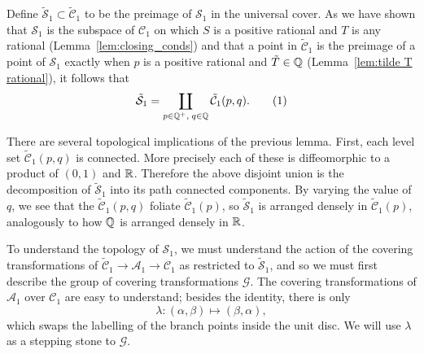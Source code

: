 Define $\mathcal{\tilde{S}}_1 \subset \mathcal{\tilde{C}}_1$ to be the preimage of $\mathcal{S}_1$ in the universal cover. As we have shown that $\mathcal{S}_1$ is the subspace of $\mathcal{C}_1$ on which $S$ is a positive rational and $T$ is any rational (Lemma~\ref{lem:closing_conds}) and that a point in $\mathcal{\tilde{C}}_1$ is the preimage of a point of $\mathcal{S}_1$ exactly when $p$ is a positive rational and $\tilde{T} \in \Q$ (Lemma~\ref{lem:tilde T rational}), it follows that
\[
\mathcal{\tilde{S}}_1 = \coprod_{p\in \Q^+,\; q\in \Q} \mathcal{\tilde{C}}_1(p,q).
\labelthis{eqn:def tilde S}
\]

There are several topological implications of the previous lemma. First, each level set $\mathcal{\tilde{C}}_1(p,q)$ is connected. More precisely each of these is diffeomorphic to a product of $(0,1)$ and $\R$. Therefore the above disjoint union is the decomposition of $\mathcal{\tilde{S}}_1$ into its path connected components. By varying the value of $q$, we see that the $\mathcal{\tilde{C}}_1(p,q)$ foliate $\mathcal{\tilde{C}}_1(p)$, so $\mathcal{\tilde{S}}_1$ is arranged densely in $\mathcal{\tilde{C}}_1(p)$, analogously to how $\Q$ is arranged densely in $\R$.

To understand the topology of $\mathcal{S}_1$, we must understand the action of the covering transformations of $\mathcal{\tilde{C}}_1 \to \mathcal{A}_1 \to \mathcal{C}_1$ as restricted to $\tilde{\mathcal{S}}_1$, and so we must first describe the group of covering transformations $\mathcal{G}$. The covering transformations of $\mathcal{A}_1$ over $\mathcal{C}_1$ are easy to understand; besides the identity, there is only
\[
λ : (α,β) \mapsto (β,α),
\]
which swaps the labelling of the branch points inside the unit disc. We will use $λ$ as a stepping stone to $\mathcal{G}$.



